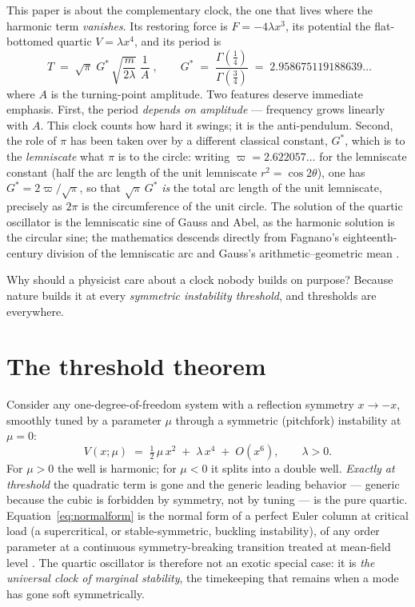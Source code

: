 \documentclass[11pt,a4paper]{article}
\newcommand{\Gstar}{{G^{*}}}
\begin{document}
This paper is about the complementary clock, the one that lives where the
harmonic term \emph{vanishes}. Its restoring force is $F=-4\lambda x^{3}$, its
potential the flat-bottomed quartic $V=\lambda x^{4}$, and its period is
\begin{equation}
\boxed{\;T \;=\; \sqrt{\pi}\;\Gstar\,\sqrt{\frac{m}{2\lambda}}\;\frac{1}{A}\;,
\qquad
\Gstar \;=\; \frac{\Gamma(\tfrac14)}{\Gamma(\tfrac34)} \;=\; 2.958675119188639\ldots}
\label{eq:period}
\end{equation}
where $A$ is the turning-point amplitude. Two features deserve immediate
emphasis. First, the period \emph{depends on amplitude} --- frequency grows
linearly with $A$. This clock counts how hard it swings; it is the
anti-pendulum. Second, the role of $\pi$ has been taken over by a different
classical constant, $\Gstar$, which is to the \emph{lemniscate} what $\pi$ is
to the circle: writing $\varpi=2.622057\ldots$ for the lemniscate constant
(half the arc length of the unit lemniscate $r^{2}=\cos2\theta$), one has
$\Gstar = 2\varpi/\sqrt{\pi}$, so that $\sqrt{\pi}\,\Gstar$ \emph{is} the
total arc length of the unit lemniscate, precisely as $2\pi$ is the
circumference of the unit circle. The solution of the quartic oscillator is
the lemniscatic sine of Gauss and Abel, as the harmonic solution is the
circular sine; the mathematics descends directly from Fagnano's
eighteenth-century division of the lemniscatic arc and Gauss's
arithmetic--geometric mean \cite{ww,siegel}.

Why should a physicist care about a clock nobody builds on purpose? Because
nature builds it at every \emph{symmetric instability threshold}, and
thresholds are everywhere.

\section{The threshold theorem}
\label{sec:threshold}

Consider any one-degree-of-freedom system with a reflection symmetry
$x\to-x$, smoothly tuned by a parameter $\mu$ through a symmetric (pitchfork)
instability at $\mu=0$:
\begin{equation}
V(x;\mu) \;=\; \tfrac12\,\mu\,x^{2} \;+\; \lambda\,x^{4} \;+\; O(x^{6}),
\qquad \lambda>0 .
\label{eq:normalform}
\end{equation}
For $\mu>0$ the well is harmonic; for $\mu<0$ it splits into a double well.
\emph{Exactly at threshold} the quadratic term is gone and the generic leading
behavior --- generic because the cubic is forbidden by symmetry, not by
tuning --- is the pure quartic. Equation~\eqref{eq:normalform} is the normal
form of a perfect Euler column at critical load (a supercritical, or
stable-symmetric, buckling instability), of any order parameter at a
continuous symmetry-breaking transition treated at mean-field level
\cite{landau}. The quartic oscillator is therefore not an exotic special
case: it is \emph{the universal clock of marginal stability}, the timekeeping
that remains when a mode has gone soft symmetrically.
\end{document}

